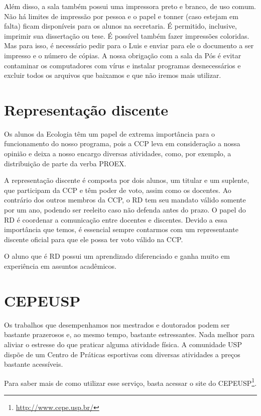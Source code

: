 \documentclass[twoside a4paper 12pt]{report}
\begin{document}
Além disso, a sala também possui uma impressora preto e branco, de uso comum. Não há limites de impressão por pessoa e o papel e tonner (caso estejam em falta) ficam disponíveis para os alunos na secretaria. É permitido, inclusive, imprimir sua dissertação ou tese. É possível também fazer impressões coloridas. Mas para isso, é necessário pedir para o Luis e enviar para ele o documento a ser impresso e o número de cópias. A nossa obrigação com a sala da Pós é evitar contaminar os computadores com vírus e instalar programas desnecessários e excluir todos os arquivos que baixamos e que não iremos mais utilizar.


\section{Representação discente}\label{representacao-discente}

Os alunos da Ecologia têm um papel de extrema importância para o funcionamento do nosso programa, pois a CCP leva em consideração a nossa opinião e deixa a nosso encargo diversas atividades, como, por exemplo, a distribuição de parte da verba PROEX.

A representação discente é composta por dois alunos, um titular e um suplente, que participam da CCP e têm poder de voto, assim como os docentes. Ao contrário dos outros membros da CCP, o RD tem seu mandato válido somente por um ano, podendo ser reeleito caso não defenda antes do prazo. O papel do RD é coordenar a comunicação entre docentes e
discentes. Devido a essa importância que temos, é essencial sempre contarmos com um representante discente oficial para que ele possa ter voto válido na CCP.

O aluno que é RD possui um aprendizado diferenciado e ganha muito em experiência em assuntos acadêmicos.

\section{CEPEUSP}\label{cepeusp}

Os trabalhos que desempenhamos nos mestrados e doutorados podem ser bastante prazerosos e, ao mesmo tempo, bastante estressantes. Nada melhor para aliviar o estresse do que praticar alguma atividade física. A comunidade USP dispõe de um Centro de Práticas esportivas com diversas atividades a preços bastante acessíveis.

Para saber mais de como utilizar esse serviço, basta acessar o site do CEPEUSP\footnote{\url{http://www.cepe.usp.br/}}.
\end{document}
